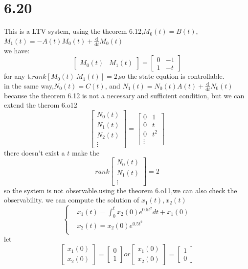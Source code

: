 \documentclass{article}
\begin{document}
\section*{6.20}
This is a LTV system,
using the theorem 6.12,$M_0(t)=B(t)$,$M_1(t)=-A(t)M_0(t)+\frac{\mathrm{d}}{\mathrm{d}t}M_0(t)$\\
we have:
\[
\left[
    \begin{array}{cc}
    M_0(t) & M_1(t)        
    \end{array}
\right]=
\left[
    \begin{array}{cc}
    0 & -1\\
    1 & -t    
    \end{array}
\right] 
\]
for any t,$rank[M_0(t)\ M_1(t)]=2$,so the state eqution is controllable.\\
in the same way,$N_0(t)=C(t)$, and $N_1(t)=N_0(t)A(t)+\frac{\mathrm{d}}{\mathrm{d}t}N_0(t)$
because the theorem 6.12 is not a necessary and sufficient condition, but we can extend the therom 6.o12
\[
\left[
    \begin{array}{c}
    N_0(t)\\
    N_1(t)\\
    N_2(t)\\
    \vdots        
    \end{array}
\right]=
\left[
    \begin{array}{cc}
    0 & 1\\
    0 & t \\
    0 & t^2\\
    \vdots   
    \end{array}
\right] 
\]
there doesn't exist a $t$ make the 
\[
rank
\left[
    \begin{array}{c}
    N_0(t)\\
    N_1(t)\\
    \vdots       
    \end{array}
\right]=2
\]
so the system is not observable.using the theorem 6.o11,we can also check the observability.
we can compute the solution of $x_1(t),x_2(t)$\\
\[
\left\{
    \begin{aligned}
    & x_1(t)=\int_0^tx_2(0)e^{0.5t^{2}}dt +x_1(0)\\
    & x_2(t)=x_2(0)e^{0.5t^2}\\
    \end{aligned}
\right.    
\]
let 
\[
\left[
    \begin{aligned}
        x_1(0)\\
        x_2(0)
    \end{aligned}
\right]=
\left[
    \begin{aligned}
        0\\
        1
    \end{aligned}
\right]
or
\left[
    \begin{aligned}
        x_1(0)\\
        x_2(0)
    \end{aligned}
\right]=
\left[
    \begin{aligned}
        1\\
        0
    \end{aligned}
\right]
\]
\end{document}
